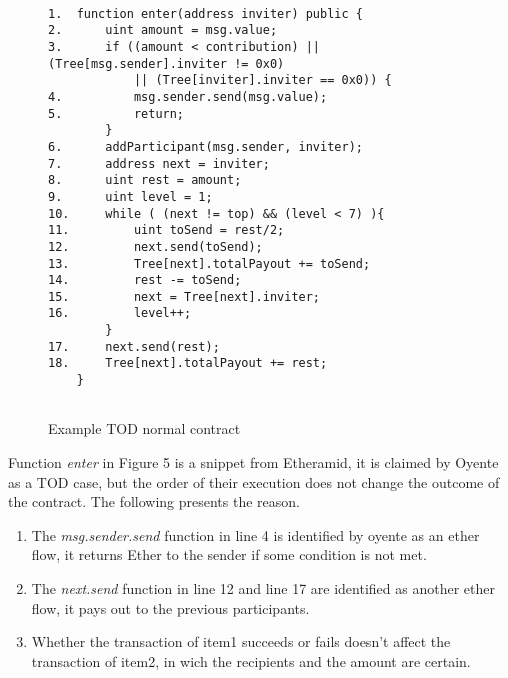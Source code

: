 \documentclass[sigconf,review,anonymous]{acmart}
\begin{document}
\begin{figure}	
	{\footnotesize
	\begin{verbatim}
	
1.	function enter(address inviter) public {
2.	    uint amount = msg.value;
3.	    if ((amount < contribution) || (Tree[msg.sender].inviter != 0x0) 
            || (Tree[inviter].inviter == 0x0)) {
4.	        msg.sender.send(msg.value);
5.	        return;
	    }
6.	    addParticipant(msg.sender, inviter);
7.	    address next = inviter;
8.	    uint rest = amount;
9.	    uint level = 1;
10.	    while ( (next != top) && (level < 7) ){
11.	        uint toSend = rest/2;
12.	        next.send(toSend);
13.	        Tree[next].totalPayout += toSend;
14.	        rest -= toSend;
15.	        next = Tree[next].inviter;
16.	        level++;
	    }
17.	    next.send(rest);
18.	    Tree[next].totalPayout += rest;
	}
	
	\end{verbatim} }
\caption{Example TOD normal contract}
\label{Sample 4}
\end{figure}

Function \emph{enter} in Figure 5 is a snippet from Etheramid, it is claimed by Oyente as a TOD case, but the order of their execution does not change the outcome of the contract. The following presents the reason.

\begin{enumerate}
    \item The \emph{msg.sender.send} function in line 4 is identified by oyente as an ether flow, it returns Ether to the sender if some condition is not met.

    \item The \emph{next.send} function in line 12 and line 17 are identified as another ether flow, it pays out to the previous participants. 

    \item Whether the transaction of item1 succeeds or fails doesn't affect the transaction of item2, in wich the recipients and the amount are certain.

\end{enumerate}



\end{document}
